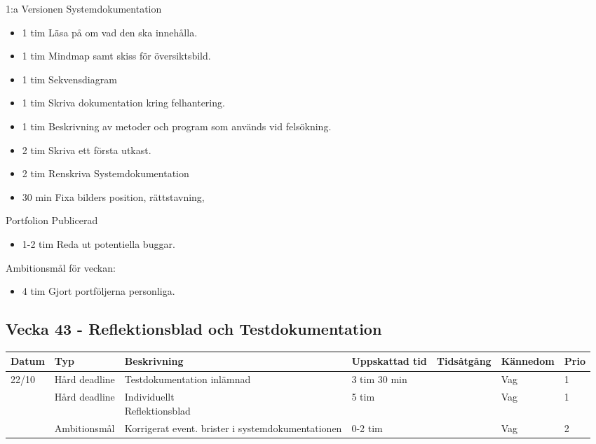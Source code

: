 \documentclass{TDP003mall}
\begin{document}
1:a Versionen Systemdokumentation
\begin{itemize}
  \item 1 tim Läsa på om vad den ska innehålla.
  \item 1 tim Mindmap samt skiss för översiktsbild.
  \item 1 tim Sekvensdiagram
  \item 1 tim Skriva dokumentation kring felhantering.
  \item 1 tim Beskrivning av metoder och program som används vid felsökning.
  \item 2 tim Skriva ett första utkast.
  \item 2 tim Renskriva Systemdokumentation
  \item 30 min Fixa bilders position, rättstavning, 
\end{itemize}

Portfolion Publicerad
\begin{itemize}
\item 1-2 tim Reda ut potentiella buggar.
  \end{itemize}

Ambitionsmål för veckan:
\begin{itemize}
\item 4 tim Gjort portföljerna personliga.
\end{itemize}

\newpage

\subsection*{Vecka 43 - Reflektionsblad och Testdokumentation}
\begin{tabularx}{\linewidth}{|l|l|X|l|l|l|l|}
	\hline
	Datum & Typ           & Beskrivning                                       & Uppskattad tid & Tidsåtgång & Kännedom & Prio \\ [0.5ex]
	\hline                                                                             
	22/10 & Hård deadline & Testdokumentation inlämnad                        & 3 tim 30 min             &            & Vag      & 1    \\
	\hline                                                                             
          & Hård deadline & \makecell[tl]{Individuellt \\Reflektionsblad}                      & 5 tim             &            & Vag      & 1    \\
	\hline                                                                             
          & Ambitionsmål  & Korrigerat event. brister i systemdokumentationen & 0-2 tim          &            & Vag      & 2    \\
	\hline
\end{tabularx}
\end{document}
